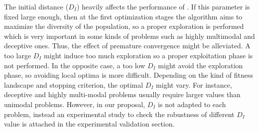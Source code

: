 %


The initial distance ($D_I$) heavily affects the performance of \DEEDM{}.
%
If this parameter is fixed large enough, then at the first optimization stages the algorithm aims to maximize the diversity of the population, 
so a proper exploration is performed which is very important in some kinds of problems such as highly multimodal and deceptive ones.
%
Thus, the effect of premature convergence might be alleviated.
%
A too large $D_I$ might induce too much exploration so a proper exploitation phase is not performed.
%
In the opposite case, a too low $D_I$ might avoid the exploration phase, so avoiding local optima is more difficult.
%
Depending on the kind of fitness landscape and stopping criterion, the optimal $D_I$ might vary.
%
For instance, deceptive and highly multi-modal problems usually require larger values than unimodal problems.
%
However, in our proposal, $D_I$ is not adapted to each problem, instead an experimental study to check the robustness
of different $D_I$ value is attached in the experimental validation section. 
%
%
%
%
%
%
%
%

